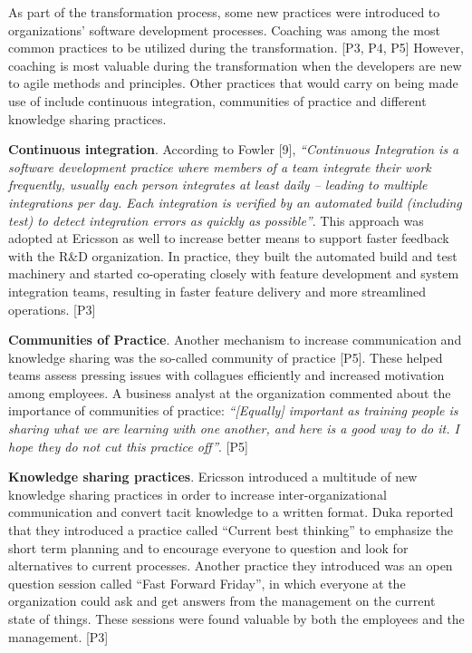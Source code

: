 As part of the transformation process, some new practices were
introduced to organizations' software development processes. Coaching
was among the most common practices to be utilized during the
transformation. [P3, P4, P5] However, coaching is most valuable during
the transformation when the developers are new to agile methods and
principles. Other practices that would carry on being made use of
include continuous integration, communities of practice and different
knowledge sharing practices.

{\bfseries Continuous integration}. According to Fowler [9],
\textit{``Continuous Integration is a software development practice
where members of a team integrate their work frequently, usually each
person integrates at least daily – leading to multiple integrations
per day. Each integration is verified by an automated build (including
test) to detect integration errors as quickly as possible''}. This
approach was adopted at Ericsson as well to increase better means to
support faster feedback with the R\&D organization. In practice, they
built the automated build and test machinery and started co-operating
closely with feature development and system integration teams, resulting
in faster feature delivery and more streamlined operations. [P3]

{\bfseries Communities of Practice}. Another mechanism to increase
communication and knowledge sharing was the so-called community of
practice [P5]. These helped teams assess pressing issues with collagues
efficiently and increased motivation among employees. A business analyst
at the organization commented about the importance of communities of
practice: \textit{``[Equally] important as training people is sharing
what we are learning with one another, and here is a good way to do it.
I hope they do not cut this practice off''}. [P5]

{\bfseries Knowledge sharing practices}. Ericsson introduced a
multitude of new knowledge sharing practices in order to increase
inter-organizational communication and convert tacit knowledge to a
written format. Duka reported that they introduced a practice called
``Current best thinking'' to emphasize the short term planning and to
encourage everyone to question and look for alternatives to current
processes. Another practice they introduced was an open question session
called ``Fast Forward Friday'', in which everyone at the organization
could ask and get answers from the management on the current state of
things. These sessions were found valuable by both the employees and the
management. [P3]
